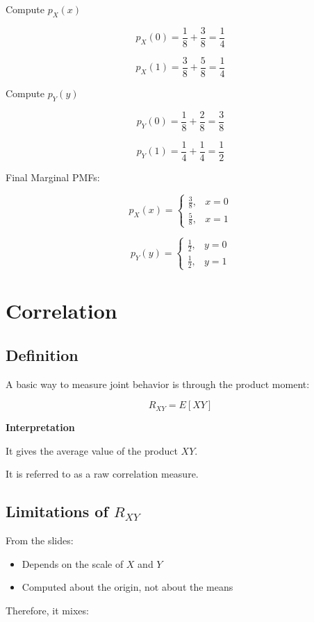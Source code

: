 \documentclass[12pt]{article}
\begin{document}
Compute $p_X(x)$

\[
p_X(0) = \frac{1}{8} + \frac{3}{8} = \frac{1}{4}
\]

\[
p_X(1) = \frac{3}{8} + \frac{5}{8} = \frac{1}{4}
\]

Compute $p_Y(y)$

\[
p_Y(0) = \frac{1}{8} + \frac{2}{8} = \frac{3}{8}
\]

\[
p_Y(1) = \frac{1}{4} + \frac{1}{4} = \frac{1}{2}
\]

Final Marginal PMFs:

\[
p_X(x) =
\begin{cases}
\frac{3}{8}, & x = 0 \\
\frac{5}{8}, & x = 1
\end{cases}
\]

\[
p_Y(y) =
\begin{cases}
\frac{1}{2}, & y = 0 \\
\frac{1}{2}, & y = 1
\end{cases}
\]

\section{Correlation}

\subsection{Definition}

A basic way to measure joint behavior is through the product moment:

\[
R_{XY} = E[XY]
\]

\textbf{Interpretation}

It gives the average value of the product $XY$.

It is referred to as a raw correlation measure.

\subsection{Limitations of $R_{XY}$}

From the slides:

\begin{itemize}
\item Depends on the scale of $X$ and $Y$
\item Computed about the origin, not about the means
\end{itemize}

Therefore, it mixes:
\end{document}
